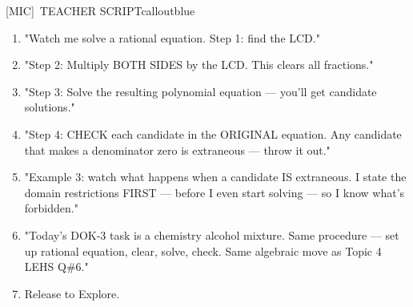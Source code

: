 \documentclass[11pt]{article}
\newcommand{\IconMic}{[MIC]}
\begin{document}
\begin{callout}{\IconMic\ TEACHER SCRIPT}{calloutblue}
\begin{enumerate}[leftmargin=1.5em,itemsep=2pt,topsep=2pt]
\item "Watch me solve a rational equation. Step 1: find the LCD."
\item "Step 2: Multiply BOTH SIDES by the LCD. This clears all fractions."
\item "Step 3: Solve the resulting polynomial equation --- you'll get candidate solutions."
\item "Step 4: CHECK each candidate in the ORIGINAL equation. Any candidate that makes a denominator zero is extraneous --- throw it out."
\item "Example 3: watch what happens when a candidate IS extraneous. I state the domain restrictions FIRST --- before I even start solving --- so I know what's forbidden."
\item "Today's DOK-3 task is a chemistry alcohol mixture. Same procedure --- set up rational equation, clear, solve, check. Same algebraic move as Topic 4 LEHS Q\#6."
\item Release to Explore.
\end{enumerate}
\end{callout}
\end{document}
